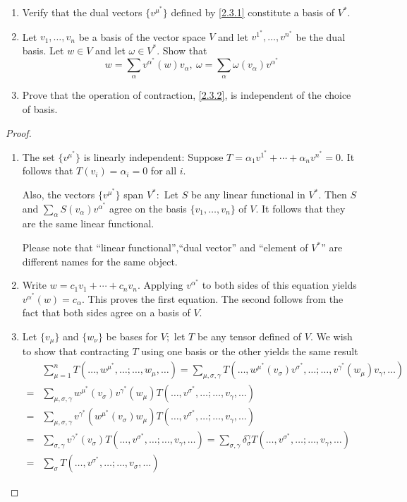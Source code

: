 \begin{problem}\leavevmode
\begin{enumerate}[label=(\alph*)]
    \item Verify that the dual vectors $\{v^{\mu^*}\}$ defined by \eqref{2.3.1} constitute a basis of $V^*$.
    \item Let $v_1,\ldots,v_n$ be a basis of the vector space $V$ and let $v^{1^*},\ldots,v^{n^*}$ be the dual basis. Let $w\in V$ and let $\omega\in V^*$. Show that
    \[w=\sum_\alpha v^{\alpha^*}(w)v_\alpha,\ \omega=\sum_\alpha\omega(v_\alpha)v^{\alpha^*}\]
    \item Prove that the operation of contraction, \eqref{2.3.2}, is independent of the choice of basis.
\end{enumerate}
\end{problem}
\begin{proof}\leavevmode\let\qed\relax
\begin{enumerate}[label=(\alph*)]
    \item The set $\{v^{\mu^*}\}$ is linearly independent: Suppose $T=\alpha_1v^{1^*}+\cdots+\alpha_nv^{n^*}=0.$ It follows that $T(v_i) = \alpha_i= 0$ for all $i.$

    Also, the vectors $\{v^{\mu^*}\}$ span $V^*:$ Let $S$ be any linear functional in $V^*.$ Then $S$ and $\sum_\alpha S(v_\alpha)v^{\alpha^*}$ agree on the basis $\{ v_1, \ldots , v_n\} $ of $V$. It follows that they are the same linear functional.

    Please note that ``linear functional'',``dual vector'' and ``element of $V^*$'' are different names for the same object.
    \item Write $w=c_1v_1+\cdots+c_nv_n.$ Applying $v^{\alpha^*}$ to both sides of this equation yields $v^{\alpha^*}(w)=c_\alpha.$ This proves the first equation. The second follows from the fact that both sides agree on a basis of $V$.
    \item Let $\{ v_\mu\} $ and $\{ w_\nu\} $ be bases for $V;$ let $T$ be any tensor defined of $V$. We wish to show that contracting $T$ using one basis or the other yields the same result
    \[\begin{aligned}
        &\sum_{\mu=1}^nT(\ldots,w^{\mu^*},\ldots;\ldots,w_\mu,\ldots)=\sum_{\mu,\sigma,\gamma}T(\ldots,w^{\mu^*}(v_\sigma)v^{\sigma^*},\ldots;\ldots,v^{\gamma^*}(w_\mu)v_\gamma,\ldots)\\
        =&\sum_{\mu,\sigma,\gamma}w^{\mu^*}(v_\sigma)v^{\gamma^*}(w_\mu)T(\ldots,v^{\sigma^*},\ldots;\ldots,v_\gamma,\ldots)\\
        =&\sum_{\mu,\sigma,\gamma}v^{\gamma^*}(w^{\mu^*}(v_\sigma)w_\mu)T(\ldots,v^{\sigma^*},\ldots;\ldots,v_\gamma,\ldots)\\
        =&\sum_{\sigma,\gamma}v^{\gamma^*}(v_\sigma)T(\ldots,v^{\sigma^*},\ldots;\ldots,v_\gamma,\ldots)=\sum_{\sigma,\gamma}\delta^\gamma_\sigma T(\ldots,v^{\sigma^*},\ldots;\ldots,v_\gamma,\ldots)\\
        =&\sum_\sigma T(\ldots,v^{\sigma^*},\ldots;\ldots,v_\sigma,\ldots)
    \end{aligned}\]
\end{enumerate}
\end{proof}

